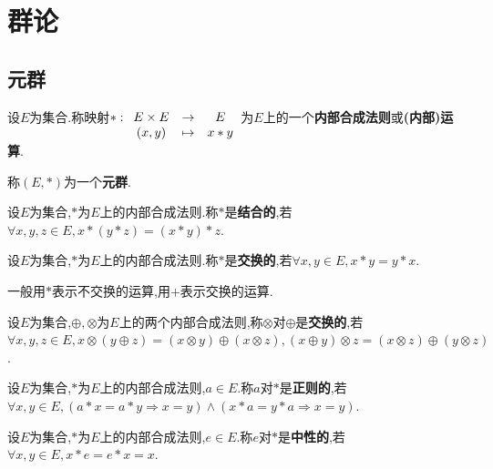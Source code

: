 \chapter{群论}

\section{元群}

\begin{deff}
    设$E$为集合.称映射$*: \begin{array}[t]{ccc} E \times E & \to & E \\ (x,y) & \mapsto & x*y \end{array}$为$E$上的一个\textbf{内部合成法则}或\textbf{(内部)运算}.

    称$(E, *)$为一个\textbf{元群}.
\end{deff}

\begin{deff}
    设$E$为集合,$*$为$E$上的内部合成法则.称$*$是\textbf{结合的},若$\forall x, y, z \in E, x * (y * z) = (x * y) * z$.
\end{deff}

\begin{deff}
    设$E$为集合,$*$为$E$上的内部合成法则.称$*$是\textbf{交换的},若$\forall x, y \in E, x * y = y * x$.
\end{deff}

\begin{rqq}
    一般用$*$表示不交换的运算,用$+$表示交换的运算.
\end{rqq}

\begin{deff}
    设$E$为集合,$\oplus, \otimes$为$E$上的两个内部合成法则,称$\otimes$对$\oplus$是\textbf{交换的},若$\forall x, y, z \in E, x \otimes (y \oplus z) = (x \otimes y) \oplus (x \otimes z), (x \oplus y) \otimes z = (x \otimes z) \oplus (y \otimes z)$.
\end{deff}

\begin{deff}
    设$E$为集合,$*$为$E$上的内部合成法则,$a \in E$.称$a$对$*$是\textbf{正则的},若$\forall x, y \in E, (a * x = a * y \Rightarrow x = y) \land (x * a = y * a \Rightarrow x = y)$.
\end{deff}

\begin{deff}
    设$E$为集合,$*$为$E$上的内部合成法则,$e \in E$.称$e$对$*$是\textbf{中性的},若$\forall x, y \in E, x * e = e * x = x$.
\end{deff}

